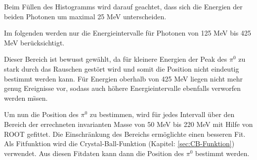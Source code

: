 \documentclass[a4paper,11pt,oneside,final,german,openbib,pdftex]{scrbook}
\begin{document}
{Beim Füllen des Histogramms wird darauf geachtet, dass sich die Energien der beiden Photonen um maximal 25 MeV unterscheiden.

Im folgenden werden nur die Energieintervalle f\"ur Photonen von 125 MeV bis 425 MeV ber\"ucksichtigt.

Dieser Bereich ist bewusst gew\"ahlt, da f\"ur kleinere Energien der Peak des $\pi^0$ zu stark durch das Rauschen gest\"ort wird und somit die Position nicht eindeutig bestimmt werden kann. F\"ur Energien oberhalb von 425 MeV liegen nicht mehr genug Ereignisse vor, sodass auch h\"ohere Energieintervalle ebenfalls verworfen werden m\"ssen. 


Um nun die Position des $\pi^0$ zu bestimmen, wird für jedes Intervall über den Bereich der errechneten invarianten Masse von 50 MeV bis 220 MeV mit Hilfe von ROOT gefittet. Die Einschr\"ankung des Bereichs erm\"oglichte einen besseren Fit. Als Fitfunktion wird die Crystal-Ball-Funktion (Kapitel: \ref{sec:CB-Funktion}) verwendet. 
Aus diesen Fitdaten kann dann die Position des $\pi^0$ bestimmt werden.
  
 
%		
 
}
\end{document}
